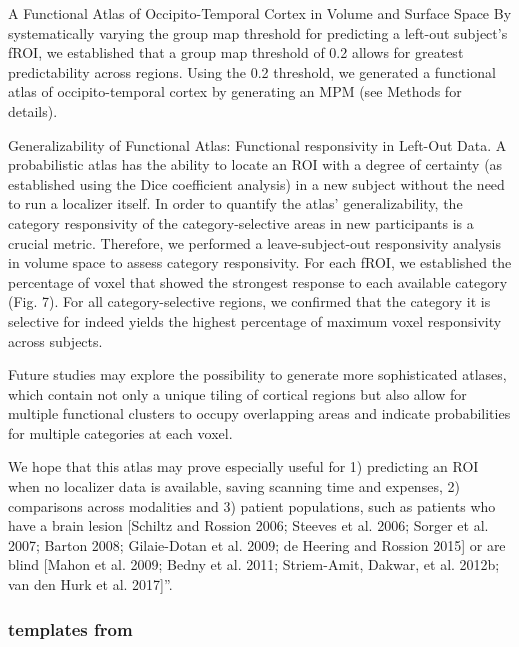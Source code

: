 A Functional Atlas of Occipito-Temporal Cortex in Volume and Surface Space
%
By systematically varying the group map threshold for predicting a left-out
subject's fROI, we established that a group map threshold of 0.2 allows for
greatest predictability across regions.
%
Using the 0.2 threshold, we generated a functional atlas of occipito-temporal
cortex by generating an MPM (see Methods for details).

Generalizability of Functional Atlas: Functional responsivity in Left-Out Data.
%
A probabilistic atlas has the ability to locate an ROI with a degree of
certainty (as established using the Dice coefficient analysis) in a new subject
without the need to run a localizer itself.
%
In order to quantify the atlas' generalizability, the category responsivity of
the category-selective areas in new participants is a crucial metric.
%
Therefore, we performed a leave-subject-out responsivity analysis in volume
space to assess category responsivity.
%
For each fROI, we established the percentage of voxel that showed the strongest
response to each available category (Fig. 7).
%
For all category-selective regions, we confirmed that the category it is
selective for indeed yields the highest percentage of maximum voxel responsivity
across subjects.

Future studies may explore the possibility to generate more
sophisticated atlases, which contain not only a unique tiling of cortical
regions but also allow for multiple functional clusters to occupy overlapping
areas and indicate probabilities for multiple categories at each voxel.

%
We hope that this atlas may prove especially useful for
%
1) predicting an ROI when no localizer data is available, saving scanning time
and expenses,
%
2) comparisons across modalities and
%
3) patient populations, such as patients who have a brain lesion [Schiltz and
Rossion 2006; Steeves et al. 2006; Sorger et al. 2007; Barton 2008; Gilaie-Dotan
et al. 2009; de Heering and Rossion 2015] or are blind [Mahon et al. 2009; Bedny
et al. 2011; Striem-Amit, Dakwar, et al.  2012b; van den Hurk et al. 2017]''.


\subsubsection{templates from \citet{weiner2018defining}}



